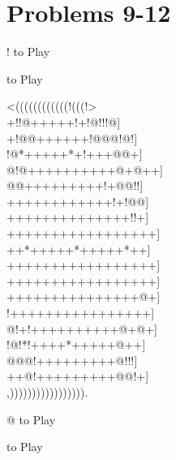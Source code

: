 \documentclass[mcrownvopaper,10pt,onecolumn,final]{memoir}
\begin{document}
\begin{figure}
\end{figure}
\section{Problems 9-12}
\begin{minipage}[c]{0.5\linewidth}
    \hspace{8.3mm} {\gnos%
        !
    }
    to Play
\end{minipage}
\begin{minipage}[c]{0.5\linewidth}
    \hspace{27mm}{\gnos%
        @
    }
    to Play
\end{minipage}
\begin{minipage}[c]{\linewidth}
    \centering
    {\gnos%
    <((((((((((((!(((!>\\
    +!!@+++++!+!@!!!@]\\
    +!@@++++++!@@@!@!]\\
    !@*+++++*+!+++@@+]\\
          @!@++++++++++@+@++]\\
    @@+++++++++!+@@!!]\\
    ++++++++++++!+!@@]\\
    ++++++++++++++!!+]\\
    +++++++++++++++++]\\
    ++*+++++*+++++*++]\\
    +++++++++++++++++]\\
    +++++++++++++++++]\\
    +++++++++++++++@+]\\
    !++++++++++++++++]\\
          @!+!++++++++++@+@+]\\
          !@!*!++++*+++++@++]\\
    @@@!+++++++++@!!!]\\
    ++@!+++++++++@@!+]\\
    ,))))))))))))))))).\\
    }
\end{minipage}
\begin{minipage}[c]{0.5\linewidth}
    \hspace{8.3mm} {\gnos%
        @
    }
    to Play
\end{minipage}
\begin{minipage}[c]{0.5\linewidth}
    \hspace{27mm}{\gnos%
        !
    }
    to Play
\end{minipage}
\newpage
\end{document}
